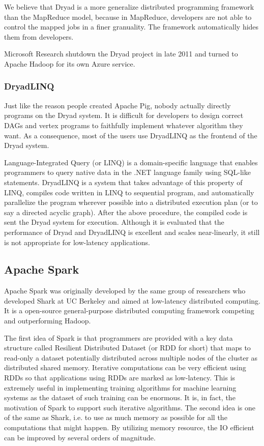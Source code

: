 \documentclass{article}
\begin{document}
We believe that Dryad is a more generalize distributed programming framework than the MapReduce model, because in MapReduce, developers are not able to control the mapped jobs in a finer granuality. The framework automatically hides them from developers.

Microsoft Research shutdown the Dryad project in late 2011 and turned to Apache Hadoop for its own Azure service.

\subsubsection{DryadLINQ}

Just like the reason people created Apache Pig, nobody actually directly programs on the Dryad system. It is difficult for developers to design correct DAGs and vertex programs to faithfully implement whatever algorithm they want. As a consequence, most of the users use DryadLINQ as the frontend of the Dryad system.\cite{youtube-dryad}

Language-Integrated Query (or LINQ) is a domain-specific language that enables programmers to query native data in the .NET language family using SQL-like statements. DryadLINQ is a system that takes advantage of this property of LINQ, compiles code written in LINQ to sequential program, and automatically parallelize the program wherever possible into a distributed execution plan (or to say a directed acyclic graph). After the above procedure, the compiled code is sent the Dryad system for execution.\cite{yu2008dryadlinq} Although it is evaluated that the performance of Dryad and DryadLINQ is excellent and scales near-linearly, it still is not appropriate for low-latency applications.

\subsection{Apache Spark}

Apache Spark was originally developed by the same group of researchers who developed Shark at UC Berkeley and aimed at low-latency distributed computing. It is a open-source general-purpose distributed computing framework competing and outperforming Hadoop.

The first idea of Spark is that programmers are provided with a key data structure called Resilient Distributed Dataset (or RDD for short) that maps to read-only a dataset potentially distributed across multiple nodes of the cluster as distributed shared memory. Iterative computations can be very efficient using RDDs so that applications using RDDs are marked as low-latency. This is extremely useful in implementing training algorithms for machine learning systems as the dataset of such training can be enormous. It is, in fact, the motivation of Spark to support such iterative algorithms.\cite{wiki:spark} The second idea is one of the same as Shark, i.e. to use as much memory as possible for all the computations that might happen. By utilizing memory resource, the IO efficient can be improved by several orders of magnitude.
\end{document}
